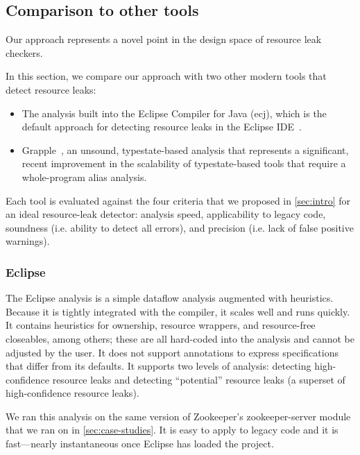 \subsection{Comparison to other tools}
\label{sec:compare}

Our approach represents a novel point in the design space of resource leak checkers.

In this section, we compare our approach with two other modern tools that detect resource leaks:
\begin{itemize}
\item The analysis built into the Eclipse Compiler for Java (ecj), which is the default approach
  for detecting resource leaks in the Eclipse IDE~\cite{ecj-resource-leak}.
\item Grapple~\cite{zuo2019grapple}, an unsound, typestate-based analysis that represents a significant, recent
  improvement in the scalability of typestate-based tools that require a whole-program alias analysis.
\end{itemize}
Each tool is evaluated against the four criteria that we proposed in \cref{sec:intro}
for an ideal resource-leak detector: analysis speed, applicability to legacy code, soundness (i.e. ability
to detect all errors), and precision (i.e. lack of false positive warnings).

\subsubsection{Eclipse}
\label{sec:eclipse}

The Eclipse analysis is a simple dataflow analysis
augmented with heuristics. Because it is tightly integrated with
the compiler, it scales well and runs quickly. It contains
heuristics for ownership, resource wrappers, and resource-free
closeables, among others; these are all hard-coded into the analysis and cannot
be adjusted by the user. It does not support annotations to express
specifications that differ from its defaults.
It supports two levels of analysis: detecting high-confidence resource
leaks and detecting ``potential'' resource
leaks (a superset of high-confidence resource leaks).

We ran this analysis on the same version of Zookeeper's zookeeper-server
module that we ran \Tool on in \cref{sec:case-studies}. It is easy to apply
to legacy code and it is fast---nearly instantaneous once Eclipse
has loaded the project.

